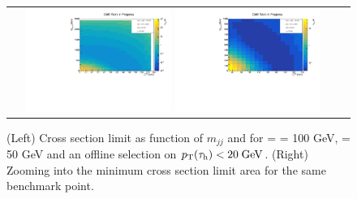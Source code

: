 \begin{figure}[tbh!]
	\centering
	\begin{tabular}{cc}
		\includegraphics[width=0.45\textwidth]{analysis/pics/JetInvMass_vs_MET_xsec_chi100_lsp050_taupt20.pdf}
		\includegraphics[width=0.45\textwidth]{analysis/pics/JetInvMass_vs_MET_xsec_chi100_lsp050_taupt20_zoom.pdf} 		
	\end{tabular}
	\caption{(Left) Cross section limit as function of $m_{jj}$ and \met for \charginopm = \neutralinotwo = 100 GeV, \neutralinoone = 50 GeV and an offline selection on $p_{\text{T}}(\tau_{\text{h}}) <  20\;\text{Ge}\kern-0.06667em\text{V}$. (Right) Zooming into the minimum cross section limit area for the same benchmark point.}
	\label{fig::JetInvMass_vs_MET_xsec_chi100_lsp050_taupt20}
\end{figure}

